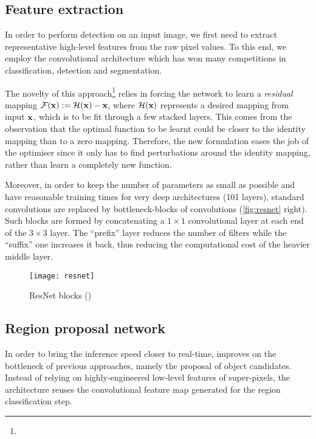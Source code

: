 
	\subsection{Feature extraction}\label{sec:resnet}
		In order to perform detection on an input image, we first need to extract representative high-level features from the raw pixel values. To this end, we employ the \RESNET{} convolutional architecture which has won many competitions in classification, detection and segmentation.

		The novelty of this approach\footnote{} relies in forcing the network to learn a \emph{residual} mapping \(\mathcal{F}(\mathbf{x}) := \mathcal{H}(\mathbf{x}) - \mathbf{x}\), where \(\mathcal{H}(\mathbf{x})\) represents a desired mapping from input \(\mathbf{x}\), which is to be fit through a few stacked layers. This comes from the observation that the optimal function to be learnt could be closer to the identity mapping than to a zero mapping. Therefore, the new formulation eases the job of the optimiser since it only has to find perturbations around the identity mapping, rather than learn a completely new function.

		Moreover, in order to keep the number of parameters as small as possible and have reasonable training times for very deep architectures (101 layers), standard convolutions are replaced by bottleneck-blocks of convolutions (\autoref{fig:resnet} right). Such blocks are formed by concatenating a \(1 \times 1\) convolutional layer at each end of the \(3 \times 3\) layer. The ``prefix'' layer reduces the number of filters while the ``suffix'' one increases it back, thus reducing the computational cost of the heavier middle layer.

		\begin{figure}
			\centering
			\texttt{[image: resnet]}
			\caption{ResNet blocks (\citet{resnet})
				\label{fig:resnet}
			}
		\end{figure}



	\subsection{Region proposal network}\label{sec:frcnn_rpn}
		In order to bring the inference speed closer to real-time, \FRCNN{} improves on the bottleneck of previous approaches, namely the proposal of object candidates. Instead of relying on highly-engineered low-level features of super-pixels, the architecture reuses the convolutional feature map generated for the region classification step.

